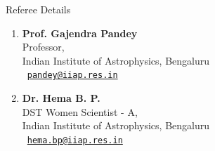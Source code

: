 \documentclass{resume} %
\begin{document}
\begin{rSection}{Referee Details}
\begin{multicols}{2}
\begin{enumerate}
    \item[\textbf{1.}] {\bf Prof. Gajendra Pandey}\\
    Professor,\\
    Indian Institute of Astrophysics, Bengaluru\\
    {\faEnvelope} \ \texttt{\href{mailto:pandey@iiap.res.in}{pandey@iiap.res.in}}

    \item[\textbf{2.}] {\bf Dr. Hema B. P.}\\
    DST Women Scientist - A,\\
    Indian Institute of Astrophysics, Bengaluru\\
    {\faEnvelope} \ \texttt{\href{mailto:hema.bp@iiap.res.in}{hema.bp@iiap.res.in}}


\end{enumerate}

\end{multicols}
\end{rSection}
\end{document}
